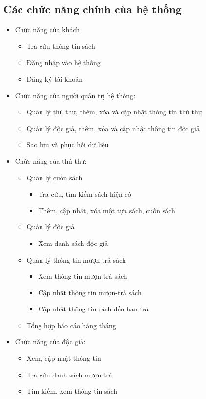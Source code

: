 \documentclass[12pt]{report}
\begin{document}
		\subsection{Các chức năng chính của hệ thống}
			\begin{itemize}
				
				\item Chức năng của khách
					\begin{itemize}
						\item Tra cứu thông tin sách
						\item Đăng nhập vào hệ thống
						\item Đăng ký tài khoản
					\end{itemize}
				\item Chức năng của người quản trị hệ thống:
					\begin{itemize}
						\item Quản lý thủ thư, thêm, xóa và cập nhật thông tin thủ thư
						\item Quản lý độc giả, thêm, xóa và cập nhật thông tin độc giả
						\item Sao lưu và phục hồi dữ liệu
					\end{itemize}
				\item Chức năng của thủ thư:
				\begin{itemize}
					\item Quản lý cuốn sách
					\begin{itemize}
						\item Tra cứu, tìm kiếm sách hiện có
						\item Thêm, cập nhật, xóa một tựa sách, cuốn sách
					\end{itemize}
				\item Quản lý độc giả
					\begin{itemize}
						\item Xem danh sách độc giả
					\end{itemize}
				\item Quản lý thông tin mượn-trả sách
					\begin{itemize}
						\item Xem thông tin mượn-trả sách 
						\item Cập nhật thông tin mượn-trả sách
						\item Cập nhật thông tin sách đến hạn trả
					\end{itemize}
				\item Tổng hợp báo cáo hàng tháng
				\end{itemize}
				\item Chức năng của độc giả:
					\begin{itemize}
						\item Xem, cập nhật thông tin
						\item Tra cứu danh sách mượn-trả
						\item Tìm kiếm, xem thông tin sách
					\end{itemize}
			\end{itemize}
\end{document}
